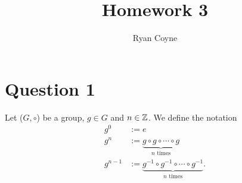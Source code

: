 \documentclass[12pt]{article}
\title{Homework 3}
\author{Ryan Coyne}
\begin{document}
    \maketitle

    \section*{Question 1}
    Let (\(G, \circ\)) be a group, \(g\in G\) and \(n\in \mathbb{Z}\). We define the notation
    \begin{equation*}
        \begin{split}
            g^0 &:= e\\
            g^n &:= \underbrace{g\circ g\circ\cdots\circ g}_{n\text{ times}}\\
            g^{n-1} &:= \underbrace{g^{-1}\circ g^{-1}\circ \cdots \circ g^{-1}}_{n\text{ times}}.
        \end{split}
    \end{equation*}
\end{document}
